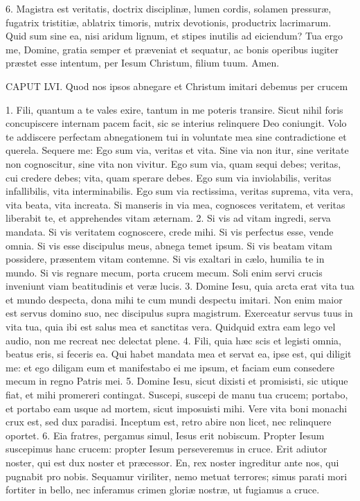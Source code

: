 6. Magistra est veritatis, doctrix disciplinæ, lumen cordis, solamen pressuræ, fugatrix tristitiæ, ablatrix timoris, nutrix devotionis, productrix lacrimarum. Quid sum sine ea, nisi aridum lignum, et stipes inutilis ad eiciendum? Tua ergo me, Domine, gratia semper et præveniat et sequatur, ac bonis operibus iugiter præstet esse intentum, per Iesum Christum, filium tuum. Amen.


CAPUT LVI.
Quod nos ipsos abnegare et Christum imitari debemus per crucem

1. Fili, quantum a te vales exire, tantum in me poteris transire. Sicut nihil foris concupiscere internam pacem facit, sic se interius relinquere Deo coniungit. Volo te addiscere perfectam abnegationem tui in voluntate mea sine contradictione et querela. Sequere me: Ego sum via, veritas et vita. Sine via non itur, sine veritate non cognoscitur, sine vita non vivitur. Ego sum via, quam sequi debes; veritas, cui credere debes; vita, quam sperare debes. Ego sum via inviolabilis, veritas infallibilis, vita interminabilis. Ego sum via rectissima, veritas suprema, vita vera, vita beata, vita increata. Si manseris in via mea, cognosces veritatem, et veritas liberabit te, et apprehendes vitam æternam.
2. Si vis ad vitam ingredi, serva mandata. Si vis veritatem cognoscere, crede mihi. Si vis perfectus esse, vende omnia. Si vis esse discipulus meus, abnega temet ipsum. Si vis beatam vitam possidere, præsentem vitam contemne. Si vis exaltari in cælo, humilia te in mundo. Si vis regnare mecum, porta crucem mecum. Soli enim servi crucis inveniunt viam beatitudinis et veræ lucis.
3. Domine Iesu, quia arcta erat vita tua et mundo despecta, dona mihi te cum mundi despectu imitari. Non enim maior est servus domino suo, nec discipulus supra magistrum. Exerceatur servus tuus in vita tua, quia ibi est salus mea et sanctitas vera. Quidquid extra eam lego vel audio, non me recreat nec delectat plene.
4. Fili, quia hæc scis et legisti omnia, beatus eris, si feceris ea. Qui habet mandata mea et servat ea, ipse est, qui diligit me: et ego diligam eum et manifestabo ei me ipsum, et faciam eum consedere mecum in regno Patris mei.
5. Domine Iesu, sicut dixisti et promisisti, sic utique fiat, et mihi promereri contingat. Suscepi, suscepi de manu tua crucem; portabo, et portabo eam usque ad mortem, sicut imposuisti mihi. Vere vita boni monachi crux est, sed dux paradisi. Inceptum est, retro abire non licet, nec relinquere oportet.
6. Eia fratres, pergamus simul, Iesus erit nobiscum. Propter Iesum suscepimus hanc crucem: propter Iesum perseveremus in cruce. Erit adiutor noster, qui est dux noster et præcessor. En, rex noster ingreditur ante nos, qui pugnabit pro nobis. Sequamur viriliter, nemo metuat terrores; simus parati mori fortiter in bello, nec inferamus crimen gloriæ nostræ, ut fugiamus a cruce.


